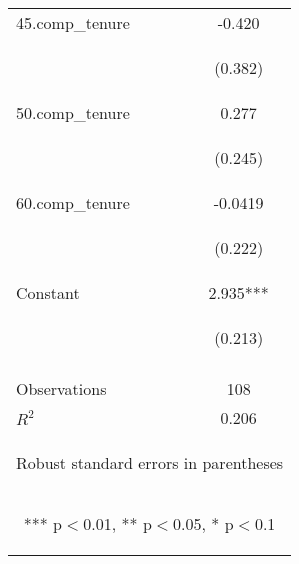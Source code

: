 \begin{center}
\begin{tabular}{lc}
45.comp\_tenure & -0.420 \\
\vspace{4pt} & \begin{footnotesize}(0.382)\end{footnotesize} \\
50.comp\_tenure & 0.277 \\
\vspace{4pt} & \begin{footnotesize}(0.245)\end{footnotesize} \\
60.comp\_tenure & -0.0419 \\
\vspace{4pt} & \begin{footnotesize}(0.222)\end{footnotesize} \\
Constant & 2.935*** \\
 & \begin{footnotesize}(0.213)\end{footnotesize} \\
\vspace{4pt} & \begin{footnotesize}\end{footnotesize} \\
Observations & 108 \\
 $R^2$ & 0.206 \\ \hline
\multicolumn{2}{c}{\begin{footnotesize} Robust standard errors in parentheses\end{footnotesize}} \\
\multicolumn{2}{c}{\begin{footnotesize} *** p$<$0.01, ** p$<$0.05, * p$<$0.1\end{footnotesize}} \\
\end{tabular}
\end{center}
